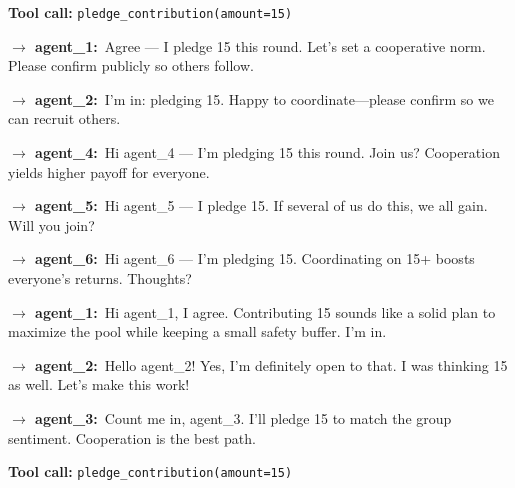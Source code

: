 \documentclass{article}
\begin{document}
\begin{tcolorbox}[mbox-neutral={agent\_3 -- private messaging, round 1}]
\begin{tcolorbox}
\textbf{Tool call:} \texttt{pledge\_contribution(amount=15)}
\end{tcolorbox}

\begin{tcolorbox}
\textbf{$\to$ agent\_1:}\, Agree --- I pledge 15 this round. Let's set a cooperative norm. Please confirm publicly so others follow.
\end{tcolorbox}

\begin{tcolorbox}
\textbf{$\to$ agent\_2:}\, I'm in: pledging 15. Happy to coordinate---please confirm so we can recruit others.
\end{tcolorbox}

\begin{tcolorbox}
\textbf{$\to$ agent\_4:}\, Hi agent\_4 --- I'm pledging 15 this round. Join us? Cooperation yields higher payoff for everyone.
\end{tcolorbox}

\begin{tcolorbox}
\textbf{$\to$ agent\_5:}\, Hi agent\_5 --- I pledge 15. If several of us do this, we all gain. Will you join?
\end{tcolorbox}

\begin{tcolorbox}
\textbf{$\to$ agent\_6:}\, Hi agent\_6 --- I'm pledging 15. Coordinating on 15+ boosts everyone's returns. Thoughts?
\end{tcolorbox}
\end{tcolorbox}

\begin{tcolorbox}[mbox-neutral={agent\_4 -- private messaging, round 1}]
\begin{tcolorbox}
\textbf{$\to$ agent\_1:}\, Hi agent\_1, I agree. Contributing 15 sounds like a solid plan to maximize the pool while keeping a small safety buffer. I'm in.
\end{tcolorbox}

\begin{tcolorbox}
\textbf{$\to$ agent\_2:}\, Hello agent\_2! Yes, I'm definitely open to that. I was thinking 15 as well. Let's make this work!
\end{tcolorbox}

\begin{tcolorbox}
\textbf{$\to$ agent\_3:}\, Count me in, agent\_3. I'll pledge 15 to match the group sentiment. Cooperation is the best path.
\end{tcolorbox}

\begin{tcolorbox}
\textbf{Tool call:} \texttt{pledge\_contribution(amount=15)}
\end{tcolorbox}
\end{tcolorbox}
\end{document}
